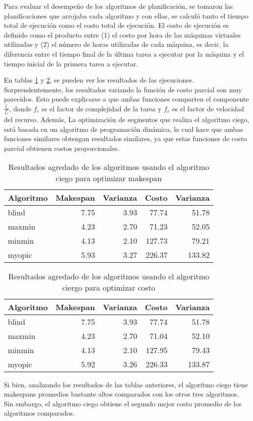 Para evaluar el desempeño de los algoritmos de planificación, se tomaron las planificaciones que arrojaba cada algoritmo y con ellas, se calculó tanto el tiempo total de ejecuci\'on como el costo total de ejecución. El costo de ejecución es definido como el producto entre (1) el costo por hora de las máquinas virtuales utilizadas y (2) el número de horas utilizadas de cada máquina, es decir, la diferencia entre el tiempo final de la última tarea a ejecutar por la máquina y el tiempo inicial de la primera tarea a ejecutar.

En tablas \ref{table:results_makespan} y \ref{table:results_cost}, se pueden ver los resultados de las ejecuciones. Sorprendentemente, los resultados variando la funci\'on de costo parcial son muy parecidos. Esto puede explicarse a que ambas funciones comparten el componente $\frac{f_c}{f_v}$, donde $f_c$ es el factor de complejidad de la tarea y $f_v$ es el factor de velocidad del recurso. Adem\'as, La optimizaci\'on de segmentos que realiza el algoritmo ciego, est\'a basada en un algoritmo de programaci\'on din\'amica, lo cual hace que ambas funciones similares obtengan resultados similares, ya que estas funciones de costo parcial obtienen costos proporcionales.

\begin{table}[ht]
\centering
\begin{tabular}{lrrrr}
  \hline
Algoritmo & Makespan & Varianza & Costo & Varianza \\ 
  \hline
blind & 7.75 & 3.93 & 77.74 & 51.78 \\ 
  maxmin & 4.23 & 2.70 & 71.23 & 52.05 \\ 
  minmin & 4.13 & 2.10 & 127.73 & 79.21 \\ 
  myopic & 5.93 & 3.27 & 226.37 & 133.82 \\ 
   \hline
\end{tabular}
\caption{Resultados agredado de los algoritmos usando el algoritmo ciego para optimizar makespan} 
\label{table:results_makespan}
\end{table}


\begin{table}[ht]
\centering
\begin{tabular}{lrrrr}
  \hline
Algoritmo & Makespan & Varianza & Costo & Varianza \\ 
  \hline
blind & 7.75 & 3.93 & 77.74 & 51.78 \\ 
  maxmin & 4.23 & 2.70 & 71.04 & 52.10 \\ 
  minmin & 4.13 & 2.10 & 127.95 & 79.43 \\ 
  myopic & 5.92 & 3.26 & 226.33 & 133.87 \\ 
   \hline
\end{tabular}
\caption{Resultados agredado de los algoritmos usando el algoritmo ciergo para optimizar costo} 
\label{table:results_cost}
\end{table}


Si bien, analizando los resultados de las tablas anteriores, el algoritmo ciego tiene makespans promedios bastante altos comparados con los otros tres algoritmos. Sin embargo, el algoritmo ciego obtiene el segundo mejor costo promedio de los algoritmos comparados. 
